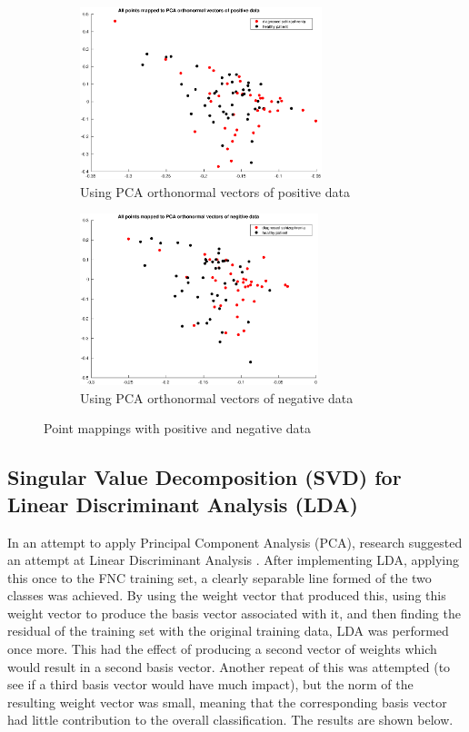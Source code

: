 \documentclass{article}
\begin{document}
\begin{figure}[H]
    \begin{subfigure}{0.5\textwidth}
        \includegraphics[width=0.9\linewidth, height=5cm]{Figures/PCApos.eps} 
        \caption{Using PCA orthonormal vectors of positive data}
    \end{subfigure}
    \begin{subfigure}{0.5\textwidth}
        \includegraphics[width=0.9\linewidth, height=5cm]{Figures/PCAneg.eps}
        \caption{Using PCA orthonormal vectors of negative data}
    \end{subfigure}
 
    \caption{Point mappings with positive and negative data}
\end{figure}


\subsection{Singular Value Decomposition (SVD) for Linear Discriminant Analysis (LDA)}
In an attempt to apply Principal Component Analysis (PCA), research suggested an attempt at Linear Discriminant Analysis \cite{SebastianRaschka2014}. After implementing LDA, applying this once to the FNC training set, a clearly separable line formed of the two classes was achieved. By using the weight vector that produced this, using this weight vector to produce the basis vector associated with it, and then finding the residual of the training set with the original training data, LDA was performed once more. This had the effect of producing a second vector of weights which would result in a second basis vector. Another repeat of this was attempted (to see if a third basis vector would have much impact), but the norm of the resulting weight vector was small, meaning that the corresponding basis vector had little contribution to the overall classification. The results are shown below.
\end{document}
